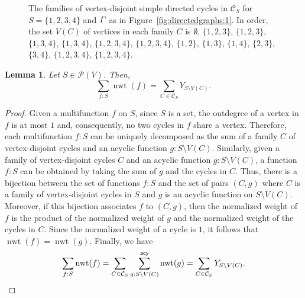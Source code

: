 \documentclass[11pt]{article}
\newtheorem{lemm}[theo]{Lemma}
\theoremstyle{definition}
\numberwithin{equation}{section}
\newcommand{\vertices}{V}
\newcommand{\powerset}[1]{\mathcal{P}(#1)}
\DeclareMathOperator{\normalizedweight}{nwt}
\newcommand{\sumacy}[1]{\sum_{#1}^{\mathsf{acy}}}
\begin{document}
\begin{figure}[htbp]
    \caption{The families of vertex-disjoint simple directed cycles in \(\mathcal{C}_S\) for \(S = \{1, 2, 3, 4\}\) and \(\varGamma\) as in Figure~\ref{fig:directedgraphs:1}.
    In order, the set \(V(C)\) of vertices in each family \(C\) is
    \(\emptyset\),
    \(\{1, 2, 3\}\), \(\{1, 2, 3\}\), \(\{1, 3, 4\}\), \(\{1, 3, 4\}\),
    \(\{1, 2, 3, 4\}\), \(\{1, 2, 3, 4\}\),
    \(\{1, 2\}\), \(\{1, 3\}\), \(\{1, 4\}\), \(\{2, 3\}\), \(\{3, 4\}\),
    \(\{1, 2, 3, 4\}\), \(\{1, 2, 3, 4\}\).}
    \label{fig:familyofcycles}
\end{figure}

\begin{lemm} \label{lemma:set:decomposition:acyclic}
    Let \(S \in \powerset{\vertices}\).
    Then,
    \begin{equation*}
        \sum_{f : S} \normalizedweight(f)
        = \sum_{C \in \mathcal{C}_S} Y_{S \setminus V(C)}.
    \end{equation*}
\end{lemm}

\begin{proof}
    Given a multifunction \(f\) on \(S\),
    since \(S\) is a set,
    the outdegree of a vertex in \(f\) is at most \(1\) and,
    consequently, no two cycles in \(f\) share a vertex.
    Therefore,
    each multifunction \(f \colon S\) can be uniquely decomposed as the sum of a family \(C\) of vertex-disjoint cycles and an acyclic function \(g \colon S \setminus V(C)\).
    Similarly, given a family of vertex-disjoint cycles \(C\) and an acyclic function \(g \colon S \setminus V(C)\),
    a function \(f \colon S\) can be obtained by taking the sum of \(g\) and the cycles in \(C\).
    Thus, there is a bijection between the set of functions \(f \colon S\) and
    the set of pairs \((C, g)\) where \(C\) is a family of vertex-disjoint cycles in \(S\) and \(g\) is an acyclic function on \(S \setminus V(C)\).
    Moreover,
    if this bijection associates \(f\) to \((C, g)\),
    then the normalized weight of \(f\) is the product of the normalized weight of \(g\) and the normalized weight of the cycles in \(C\).
    Since the normalized weight of a cycle is \(1\), it follows that \(\normalizedweight(f) = \normalizedweight(g)\).
    Finally, we have
    \begin{equation*}
        \sum_{f : S} \normalizedweight(f)
        = \sum_{C \in \mathcal{C}_S} \sumacy{g : S \setminus V(C)} \normalizedweight(g)
        = \sum_{C \in \mathcal{C}_S} Y_{S \setminus V(C)}. \qedhere
    \end{equation*}
\end{proof}
\end{document}
